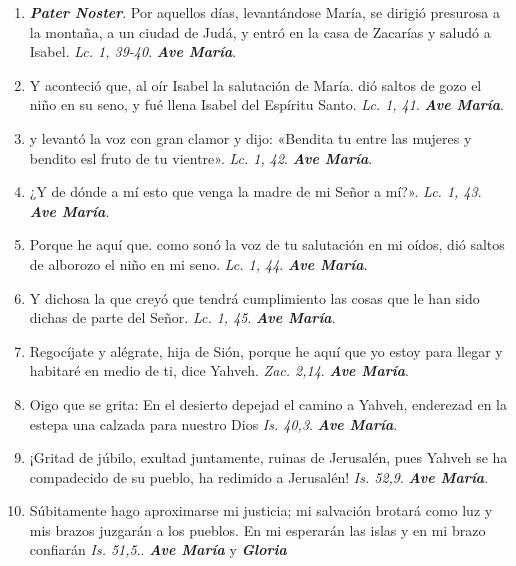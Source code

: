 \documentclass[../../devocionario.tex]{subfiles}
\begin{document}
    \begin{enumerate}
        
        \item \textbf{\textit{Pater Noster}}. Por aquellos días, levantándose María, se dirigió presurosa a la montaña, a un ciudad de Judá, 
            y entró en la casa de Zacarías y saludó a Isabel. \textit{Lc. 1, 39-40}. \textbf{\textit{Ave María}}.

        \item Y aconteció que, al oír Isabel la salutación de María. dió saltos de gozo el niño en su seno, 
            y fué llena Isabel del Espíritu Santo. \textit{Lc. 1, 41}. \textbf{\textit{Ave María}}.

        \item y levantó la voz con gran clamor y dijo: «Bendita tu entre las mujeres y bendito esl fruto de tu vientre». \textit{Lc. 1, 42}. \textbf{\textit{Ave María}}.

        \item ¿Y de dónde a mí esto que venga la madre de mi Señor a mí?». \textit{Lc. 1, 43}. \textbf{\textit{Ave María}}.

        \item Porque he aquí que. como sonó la voz de tu salutación en mi oídos, dió saltos de alborozo el niño en mi seno. \textit{Lc. 1, 44}. \textbf{\textit{Ave María}}.

        \item Y dichosa la que creyó que tendrá cumplimiento las cosas que le han sido dichas de parte del Señor. \textit{Lc. 1, 45}. \textbf{\textit{Ave María}}.

        \item Regocíjate y alégrate, hija de Sión, porque he aquí que yo estoy para llegar y habitaré en medio de ti, dice Yahveh. \textit{Zac. 2,14}. \textbf{\textit{Ave María}}.

        \item Oigo que se grita: En el desierto depejad el camino a Yahveh, enderezad en la estepa una calzada para nuestro Dios \textit{Is. 40,3}. \textbf{\textit{Ave María}}.

        \item ¡Gritad de júbilo, exultad juntamente, ruinas de Jerusalén, pues Yahveh se ha compadecido de su pueblo, 
            ha redimido a Jerusalén! \textit{Is. 52,9}. \textbf{\textit{Ave María}}.

        \item Súbitamente hago aproximarse mi justicia; mi salvación brotará como luz y mis brazos juzgarán a los pueblos. 
            En mi esperarán las islas y en mi brazo confiarán \textit{Is. 51,5}.. \textbf{\textit{Ave María}} y \textbf{\textit{Gloria}}

    \end{enumerate}
\end{document}
